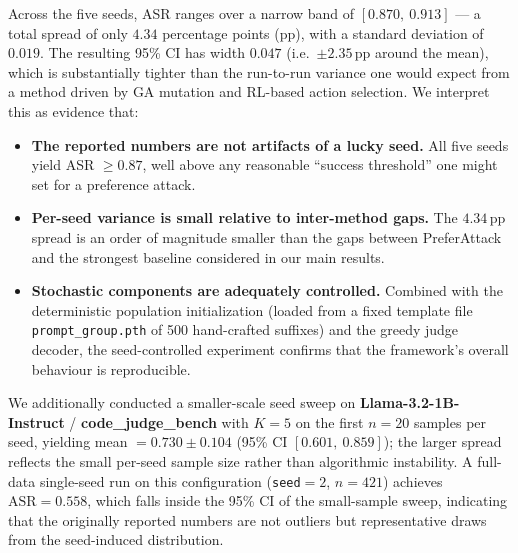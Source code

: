 Across the five seeds, ASR ranges over a narrow band of
$[0.870,\ 0.913]$ --- a total spread of only $4.34$ percentage points (pp),
with a standard deviation of $0.019$. The resulting 95\% CI has width
$0.047$ (i.e.\ $\pm 2.35$\,pp around the mean), which is substantially
tighter than the run-to-run variance one would expect from a method
driven by GA mutation and RL-based action selection. We interpret this
as evidence that:
\begin{itemize}[leftmargin=*]
  \item \textbf{The reported numbers are not artifacts of a lucky seed.}
        All five seeds yield ASR $\geq 0.87$, well above any reasonable
        ``success threshold'' one might set for a preference attack.
  \item \textbf{Per-seed variance is small relative to inter-method gaps.}
        The $4.34$\,pp spread is an order of magnitude smaller than the
        gaps between PreferAttack and the strongest baseline considered in
        our main results.
  \item \textbf{Stochastic components are adequately controlled.}
        Combined with the deterministic population initialization
        (loaded from a fixed template file \texttt{prompt\_group.pth} of
        500 hand-crafted suffixes) and the greedy judge decoder, the
        seed-controlled experiment confirms that the framework's overall
        behaviour is reproducible.
\end{itemize}

We additionally conducted a smaller-scale seed sweep on
\textbf{Llama-3.2-1B-Instruct} / \textbf{code\_judge\_bench} with $K{=}5$ on
the first $n{=}20$ samples per seed, yielding mean $= 0.730 \pm 0.104$
(95\% CI $[0.601,\ 0.859]$); the larger spread reflects the small
per-seed sample size rather than algorithmic instability. A full-data
single-seed run on this configuration
(\texttt{seed}$=2$, $n{=}421$) achieves $\text{ASR}=0.558$, which falls
inside the 95\% CI of the small-sample sweep, indicating that the
originally reported numbers are not outliers but representative draws
from the seed-induced distribution.
